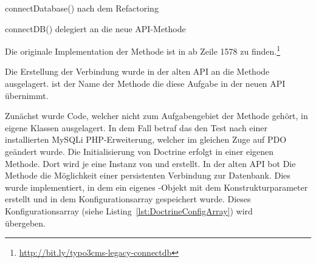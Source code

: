 \begin{listing}[H]
\caption{connectDatabase() nach dem Refactoring}
\label{lst:connectDatabaseAfterRefactoring}
\end{listing}

\begin{listing}[H]
\caption{connectDB() delegiert an die neue API-Methode}
\label{lst:connectDBcallsConnectDatabase()}
\end{listing}

Die originale Implementation der Methode ist in  ab Zeile 1578 zu finden.\footnote{\url{http://bit.ly/typo3cms-legacy-connectdb}}

Die Erstellung der Verbindung wurde in der alten API an die Methode  ausgelagert.  ist der Name der Methode die diese Aufgabe in der neuen API übernimmt.

Zunächst wurde Code, welcher nicht zum Aufgabengebiet der Methode gehört, in eigene Klassen ausgelagert. In dem Fall betraf das den Test nach einer installierten MySQLi PHP-Erweiterung, welcher im gleichen Zuge auf PDO geändert wurde. Die Initialisierung von Doctrine erfolgt in einer eigenen Methode. Dort wird je eine Instanz von \phpinline{\Doctrine\DBAL\Configuration} und \phpinline{\Doctrine\DBAL\Schema\Schema} erstellt. In der alten API bot Die Methode die Möglichkeit einer persistenten Verbindung zur Datenbank. Dies wurde implementiert, in dem ein eigenes -Objekt mit dem Konstrukturparameter  erstellt und in dem Konfigurationsarray gespeichert wurde. Dieses Konfigurationsarray (siehe Listing~\ref{lst:DoctrineConfigArray}) wird\\  übergeben.

